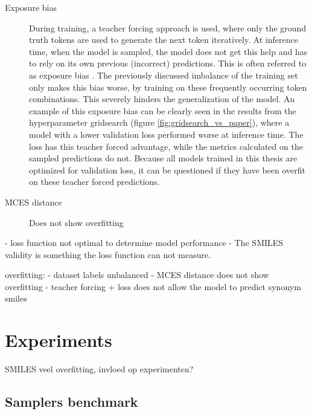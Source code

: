 \begin{description}
    \item[Exposure bias] During training, a teacher forcing approach is used, where only the ground truth tokens are used to generate the next token iteratively.
    At inference time, when the model is sampled, the model does not get this help and has to rely on its own previous (incorrect) predictions.
    This is often referred to as exposure bias \cite{schmidt2019generalization}.
    The previously discussed imbalance of the training set only makes this bias worse, by training on these frequently occurring token combinations.
    This severely hinders the generalization of the model.
    An example of this exposure bias can be clearly seen in the results from the hyperparameter gridsearch (figure \ref{fig:gridsearch_vs_paper}), where a model with a lower validation loss performed worse at inference time.
    The loss has this teacher forced advantage, while the metrics calculated on the sampled predictions do not.
    Because all models trained in this thesis are optimized for validation loss, it can be questioned if they have been overfit on these teacher forced predictions.
    
    \item[MCES distance] Does not show overfitting 
\end{description}






- loss function not optimal to determine model performance
- The SMILES validity is something the loss function can not measure.

overfitting:
    - dataset labels unbalanced
    - MCES distance does not show overfitting
    - teacher forcing + loss does not allow the model to predict synonym smiles




\section{Experiments}

SMILES veel overfitting, invloed op experimenten?

\subsection{Samplers benchmark}

